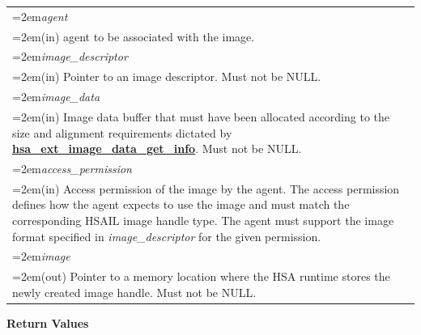 \documentclass[final,oneside]{book}
\newcommand{\reffun}[1]{\textbf{#1}}
\newcommand{\refarg}[1]{\textit{#1}}
\begin{document}
\noindent\begin{longtable}{@{}>{\hangindent=2em}p{\textwidth}}
\refarg{agent}\\\hspace{2em}(in) agent to be associated with the image.\\[2mm]
\refarg{image_\-descriptor}\\\hspace{2em}(in) Pointer to an image descriptor. Must not be NULL.\\[2mm]
\refarg{image_\-data}\\\hspace{2em}(in) Image data buffer that must have been allocated according to the size and alignment requirements dictated by \hyperlink{group__ext-images_1gad8e2426d1829f772af6e603ff226f65a}{\reffun{hsa_\-ext_\-image_\-data_\-get_\-info}}. Must not be NULL.\\[2mm]
\refarg{access_\-permission}\\\hspace{2em}(in) Access permission of the image by the agent. The access permission defines how the agent expects to use the image and must match the corresponding HSAIL image handle type. The agent must support the image format specified in \textit{image_\-descriptor} for the given permission.\\[2mm]
\refarg{image}\\\hspace{2em}(out) Pointer to a memory location where the HSA runtime stores the newly created image handle. Must not be NULL.
\end{longtable}
\vspace{-2mm}\textbf{Return Values}\\[-7mm]
\end{document}
